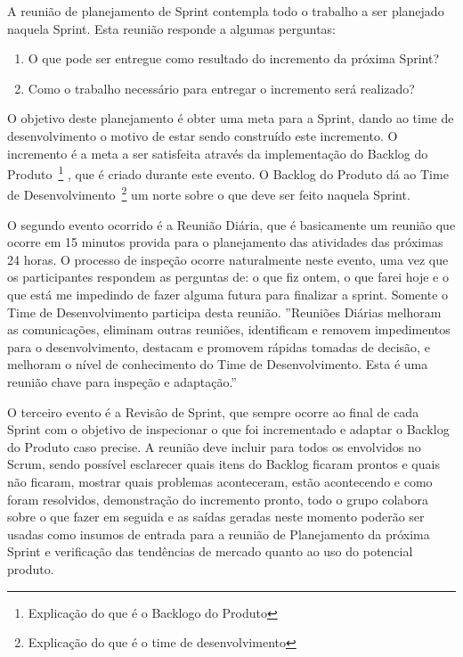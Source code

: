 	A reunião de planejamento de Sprint contempla todo o trabalho a ser planejado naquela Sprint. Esta reunião responde a algumas perguntas: 
	\begin{enumerate}
		\item O que pode ser entregue como resultado do incremento da próxima Sprint?
		\item Como o trabalho necessário para entregar o incremento será realizado?
	\end{enumerate}

	O objetivo deste planejamento é obter uma meta para a Sprint, dando ao time de desenvolvimento o motivo de estar sendo construído este incremento. O incremento é a meta a ser satisfeita através da implementação do Backlog do Produto~\footnote{Explicação do que é o Backlogo do Produto} , que é criado durante este evento. O Backlog do Produto dá ao Time de Desenvolvimento~\footnote{Explicação do que é o time de desenvolvimento} um norte sobre o que deve ser feito naquela Sprint. 	 

	O segundo evento ocorrido é a Reunião Diária, que é basicamente um reunião que ocorre em 15 minutos provida para o planejamento das atividades das próximas 24 horas. O processo de inspeção ocorre naturalmente neste evento, uma vez que os participantes respondem as perguntas de: o que fiz ontem, o que farei hoje e o que está me impedindo de fazer alguma futura para finalizar a sprint. Somente o Time de Desenvolvimento participa desta reunião. ''Reuniões Diárias melhoram as comunicações, eliminam outras reuniões, identificam e removem impedimentos para o desenvolvimento, destacam e promovem rápidas tomadas de decisão, e melhoram o nível de conhecimento do Time de Desenvolvimento. Esta é uma reunião chave para inspeção e adaptação.'' \cite[p.~11]{scrum} 

	O terceiro evento é a Revisão de Sprint, que sempre ocorre ao final de cada Sprint com o objetivo de inspecionar o que foi incrementado e adaptar o Backlog do Produto caso precise. A reunião deve incluir para todos os envolvidos no Scrum, sendo possível esclarecer quais itens do Backlog ficaram prontos e quais não ficaram, mostrar quais problemas aconteceram, estão acontecendo e como foram resolvidos, demonstração do incremento pronto, todo o grupo colabora sobre o que fazer em seguida e as saídas geradas neste momento poderão ser usadas como insumos de entrada para a reunião de Planejamento da próxima Sprint e verificação das tendências de mercado quanto ao uso do potencial produto.

